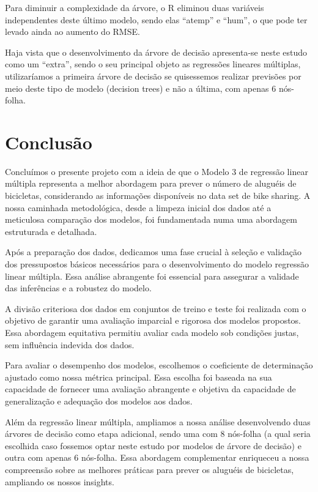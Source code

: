 \documentclass[
  letterpaper,
  DIV=11,
  numbers=noendperiod]{scrartcl}
\begin{document}
Para diminuir a complexidade da árvore, o R eliminou duas variáveis
independentes deste último modelo, sendo elas ``atemp'' e ``hum'', o que
pode ter levado ainda ao aumento do RMSE.

Haja vista que o desenvolvimento da árvore de decisão apresenta-se neste
estudo como um ``extra'', sendo o seu principal objeto as regressões
lineares múltiplas, utilizaríamos a primeira árvore de decisão se
quisessemos realizar previsões por meio deste tipo de modelo (decision
trees) e não a última, com apenas 6 nós-folha.

\section{Conclusão}\label{conclusuxe3o}

Concluímos o presente projeto com a ideia de que o Modelo 3 de regressão
linear múltipla representa a melhor abordagem para prever o número de
aluguéis de bicicletas, considerando as informações disponíveis no data
set de bike sharing. A nossa caminhada metodológica, desde a limpeza
inicial dos dados até a meticulosa comparação dos modelos, foi
fundamentada numa uma abordagem estruturada e detalhada.

Após a preparação dos dados, dedicamos uma fase crucial à seleção e
validação dos pressupostos básicos necessários para o desenvolvimento do
modelo regressão linear múltipla. Essa análise abrangente foi essencial
para assegurar a validade das inferências e a robustez do modelo.

A divisão criteriosa dos dados em conjuntos de treino e teste foi
realizada com o objetivo de garantir uma avaliação imparcial e rigorosa
dos modelos propostos. Essa abordagem equitativa permitiu avaliar cada
modelo sob condições justas, sem influência indevida dos dados.

Para avaliar o desempenho dos modelos, escolhemos o coeficiente de
determinação ajustado como nossa métrica principal. Essa escolha foi
baseada na sua capacidade de fornecer uma avaliação abrangente e
objetiva da capacidade de generalização e adequação dos modelos aos
dados.

Além da regressão linear múltipla, ampliamos a nossa análise
desenvolvendo duas árvores de decisão como etapa adicional, sendo uma
com 8 nós-folha (a qual seria escolhida caso fossemos optar neste estudo
por modelos de árvore de decisão) e outra com apenas 6 nós-folha. Essa
abordagem complementar enriqueceu a nossa compreensão sobre as melhores
práticas para prever os aluguéis de bicicletas, ampliando os nossos
insights.
\end{document}
